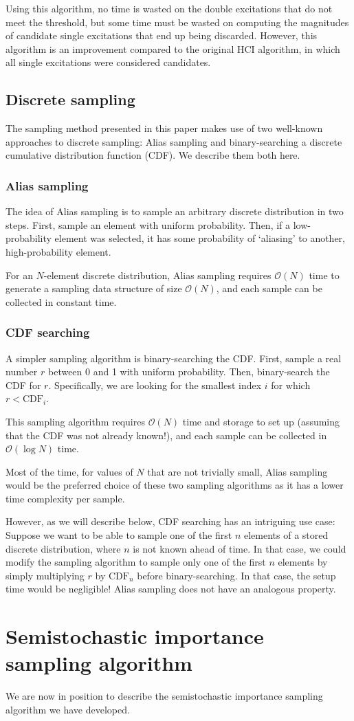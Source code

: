 \documentclass[english]{article}
\begin{document}
Using this algorithm, no time is wasted on the double excitations that do not meet the threshold, but some time must be wasted on computing the magnitudes of candidate single excitations that end up being discarded. However, this algorithm is an improvement compared to the original HCI algorithm, in which all single excitations were considered candidates.


\subsection{Discrete sampling}
The sampling method presented in this paper makes use of two well-known approaches to discrete sampling: Alias sampling and binary-searching a discrete cumulative distribution function (CDF). We describe them both here.

\subsubsection{Alias sampling}
The idea of Alias sampling is to sample an arbitrary discrete distribution in two steps. First, sample an element with uniform probability. Then, if a low-probability element was selected, it has some probability of `aliasing' to another, high-probability element.

For an $N$-element discrete distribution, Alias sampling requires $\mathcal{O}(N)$ time to generate a sampling data structure of size $\mathcal{O}(N)$, and each sample can be collected in constant time.

\subsubsection{CDF searching}
A simpler sampling algorithm is binary-searching the CDF. First, sample a real number $r$ between 0 and 1 with uniform probability. Then, binary-search the CDF for $r$. Specifically, we are looking for the smallest index $i$ for which $r<\textrm{CDF}_i$.

This sampling algorithm requires $\mathcal{O}(N)$ time and storage to set up (assuming that the CDF was not already known!), and each sample can be collected in $\mathcal{O}(\log N)$ time.

Most of the time, for values of $N$ that are not trivially small, Alias sampling would be the preferred choice of these two sampling algorithms as it has a lower time complexity per sample.

However, as we will describe below, CDF searching has an intriguing use case: Suppose we want to be able to sample one of the first $n$ elements of a stored discrete distribution, where $n$ is not known ahead of time. In that case, we could modify the sampling algorithm to sample only one of the first $n$ elements by simply multiplying $r$ by $\textrm{CDF}_n$ before binary-searching. In that case, the setup time would be negligible! Alias sampling does not have an analogous property.

\section{Semistochastic importance sampling algorithm}
We are now in position to describe the semistochastic importance sampling algorithm we have developed.
\end{document}

